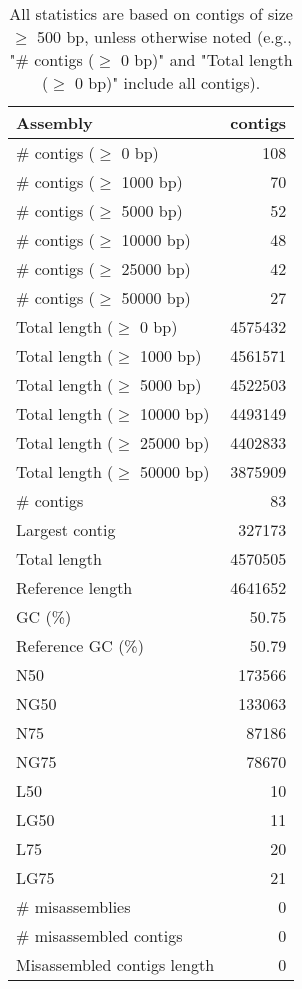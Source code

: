 \documentclass[12pt,a4paper]{article}
\begin{document}
\begin{table}[ht]
\begin{center}
\caption{All statistics are based on contigs of size $\geq$ 500 bp, unless otherwise noted (e.g., "\# contigs ($\geq$ 0 bp)" and "Total length ($\geq$ 0 bp)" include all contigs).}
\begin{tabular}{|l*{1}{|r}|}
\hline
Assembly & contigs \\ \hline
\# contigs ($\geq$ 0 bp) & 108 \\ \hline
\# contigs ($\geq$ 1000 bp) & 70 \\ \hline
\# contigs ($\geq$ 5000 bp) & 52 \\ \hline
\# contigs ($\geq$ 10000 bp) & 48 \\ \hline
\# contigs ($\geq$ 25000 bp) & 42 \\ \hline
\# contigs ($\geq$ 50000 bp) & 27 \\ \hline
Total length ($\geq$ 0 bp) & 4575432 \\ \hline
Total length ($\geq$ 1000 bp) & 4561571 \\ \hline
Total length ($\geq$ 5000 bp) & 4522503 \\ \hline
Total length ($\geq$ 10000 bp) & 4493149 \\ \hline
Total length ($\geq$ 25000 bp) & 4402833 \\ \hline
Total length ($\geq$ 50000 bp) & 3875909 \\ \hline
\# contigs & 83 \\ \hline
Largest contig & 327173 \\ \hline
Total length & 4570505 \\ \hline
Reference length & 4641652 \\ \hline
GC (\%) & 50.75 \\ \hline
Reference GC (\%) & 50.79 \\ \hline
N50 & 173566 \\ \hline
NG50 & 133063 \\ \hline
N75 & 87186 \\ \hline
NG75 & 78670 \\ \hline
L50 & 10 \\ \hline
LG50 & 11 \\ \hline
L75 & 20 \\ \hline
LG75 & 21 \\ \hline
\# misassemblies & 0 \\ \hline
\# misassembled contigs & 0 \\ \hline
Misassembled contigs length & 0 \\ \hline

\end{tabular}
\end{center}
\end{table}
\end{document}
